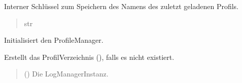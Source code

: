 \documentclass[letterpaper,10pt,english]{sphinxmanual}
\begin{document}
\begin{fulllineitems}
\begin{fulllineitems}
\begin{quote}
\begin{description}
\end{description}\end{quote}

\end{fulllineitems}


\begin{fulllineitems}
\label{\detokenize{modulab/profile_manager:modules.profile.ProfileManager.ProfileManager.KEY_LAST_PROFILE}}
\pysigstartsignatures
\pysigline
{}
\pysigstopsignatures
\sphinxAtStartPar
Interner Schlüssel zum Speichern des Namens des zuletzt geladenen Profils.
\begin{quote}\begin{description}
\sphinxAtStartPar
str

\end{description}\end{quote}

\end{fulllineitems}


\begin{fulllineitems}
\label{\detokenize{modulab/profile_manager:modules.profile.ProfileManager.ProfileManager.__init__}}
\pysigstartsignatures
\pysiglinewithargsret
{}
{}
{}
\pysigstopsignatures
\sphinxAtStartPar
Initialisiert den ProfileManager.

\sphinxAtStartPar
Erstellt das Profil\sphinxhyphen{}Verzeichnis (), falls es
nicht existiert.
\begin{quote}\begin{description}
\sphinxAtStartPar
{} () \textendash{} Die LogManager\sphinxhyphen{}Instanz.

\end{description}\end{quote}


\end{fulllineitems}
\end{fulllineitems}
\end{document}
